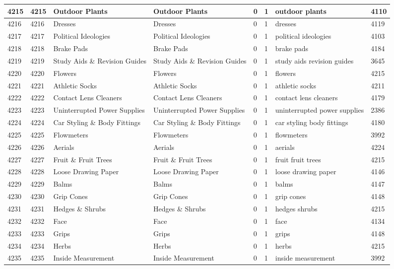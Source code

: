 \begin{longtable}{|l|l|l|l|l|l|l|l|}
4215 & 4215 & Outdoor Plants & Outdoor Plants & 0 & 1 & outdoor plants & 4110 \\ \hline 
4216 & 4216 & Dresses & Dresses & 0 & 1 & dresses & 4119 \\ \hline 
4217 & 4217 & Political Ideologies & Political Ideologies & 0 & 1 & political ideologies & 4103 \\ \hline 
4218 & 4218 & Brake Pads & Brake Pads & 0 & 1 & brake pads & 4184 \\ \hline 
4219 & 4219 & Study Aids \& Revision Guides & Study Aids \& Revision Guides & 0 & 1 & study aids revision guides & 3645 \\ \hline 
4220 & 4220 & Flowers & Flowers & 0 & 1 & flowers & 4215 \\ \hline 
4221 & 4221 & Athletic Socks & Athletic Socks & 0 & 1 & athletic socks & 4211 \\ \hline 
4222 & 4222 & Contact Lens Cleaners & Contact Lens Cleaners & 0 & 1 & contact lens cleaners & 4179 \\ \hline 
4223 & 4223 & Uninterrupted Power Supplies & Uninterrupted Power Supplies & 0 & 1 & uninterrupted power supplies & 2386 \\ \hline 
4224 & 4224 & Car Styling \& Body Fittings & Car Styling \& Body Fittings & 0 & 1 & car styling body fittings & 4180 \\ \hline 
4225 & 4225 & Flowmeters & Flowmeters & 0 & 1 & flowmeters & 3992 \\ \hline 
4226 & 4226 & Aerials & Aerials & 0 & 1 & aerials & 4224 \\ \hline 
4227 & 4227 & Fruit \& Fruit Trees & Fruit \& Fruit Trees & 0 & 1 & fruit fruit trees & 4215 \\ \hline 
4228 & 4228 & Loose Drawing Paper & Loose Drawing Paper & 0 & 1 & loose drawing paper & 4146 \\ \hline 
4229 & 4229 & Balms & Balms & 0 & 1 & balms & 4147 \\ \hline 
4230 & 4230 & Grip Cones & Grip Cones & 0 & 1 & grip cones & 4148 \\ \hline 
4231 & 4231 & Hedges \& Shrubs & Hedges \& Shrubs & 0 & 1 & hedges shrubs & 4215 \\ \hline 
4232 & 4232 & Face & Face & 0 & 1 & face & 4134 \\ \hline 
4233 & 4233 & Grips & Grips & 0 & 1 & grips & 4148 \\ \hline 
4234 & 4234 & Herbs & Herbs & 0 & 1 & herbs & 4215 \\ \hline 
4235 & 4235 & Inside Measurement & Inside Measurement & 0 & 1 & inside measurement & 3992 \\ \hline 

\end{longtable}
